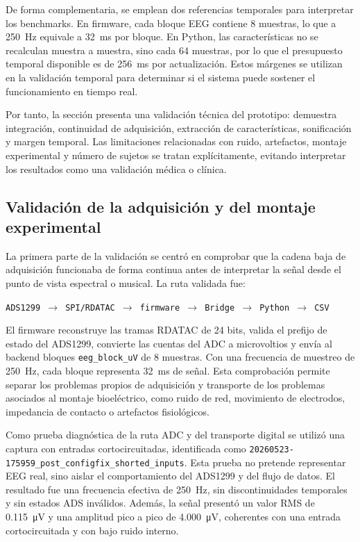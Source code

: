 \documentclass[../main.tex]{subfiles}
\begin{document}
De forma complementaria, se emplean dos referencias temporales para interpretar los benchmarks. En firmware, cada bloque EEG contiene 8 muestras, lo que a \SI{250}{\hertz} equivale a \SI{32}{\milli\second} por bloque. En Python, las características no se recalculan muestra a muestra, sino cada 64 muestras, por lo que el presupuesto temporal disponible es de \SI{256}{\milli\second} por actualización. Estos márgenes se utilizan en la validación temporal para determinar si el sistema puede sostener el funcionamiento en tiempo real.

Por tanto, la sección presenta una validación técnica del prototipo: demuestra integración, continuidad de adquisición, extracción de características, sonificación y margen temporal. Las limitaciones relacionadas con ruido, artefactos, montaje experimental y número de sujetos se tratan explícitamente, evitando interpretar los resultados como una validación médica o clínica.

\subsection{Validación de la adquisición y del montaje experimental}
\label{subsec:validacion_adquisicion_montaje}

La primera parte de la validación se centró en comprobar que la cadena baja de adquisición funcionaba de forma continua antes de interpretar la señal desde el punto de vista espectral o musical. La ruta validada fue:

\begin{center}
\texttt{ADS1299 $\rightarrow$ SPI/RDATAC $\rightarrow$ firmware $\rightarrow$ Bridge $\rightarrow$ Python $\rightarrow$ CSV}
\end{center}

El firmware reconstruye las tramas RDATAC de 24 bits, valida el prefijo de estado del ADS1299, convierte las cuentas del ADC a microvoltios y envía al backend bloques \texttt{eeg\_block\_uV} de 8 muestras. Con una frecuencia de muestreo de \SI{250}{\hertz}, cada bloque representa \SI{32}{\milli\second} de señal. Esta comprobación permite separar los problemas propios de adquisición y transporte de los problemas asociados al montaje bioeléctrico, como ruido de red, movimiento de electrodos, impedancia de contacto o artefactos fisiológicos.

Como prueba diagnóstica de la ruta ADC y del transporte digital se utilizó una captura con entradas cortocircuitadas, identificada como \texttt{20260523-175959\_post\_configfix\_shorted\_inputs}. Esta prueba no pretende representar EEG real, sino aislar el comportamiento del ADS1299 y del flujo de datos. El resultado fue una frecuencia efectiva de \SI{250}{\hertz}, sin discontinuidades temporales y sin estados ADS inválidos. Además, la señal presentó un valor RMS de \SI{0.115}{\micro\volt} y una amplitud pico a pico de \SI{4.000}{\micro\volt}, coherentes con una entrada cortocircuitada y con bajo ruido interno.
\end{document}
